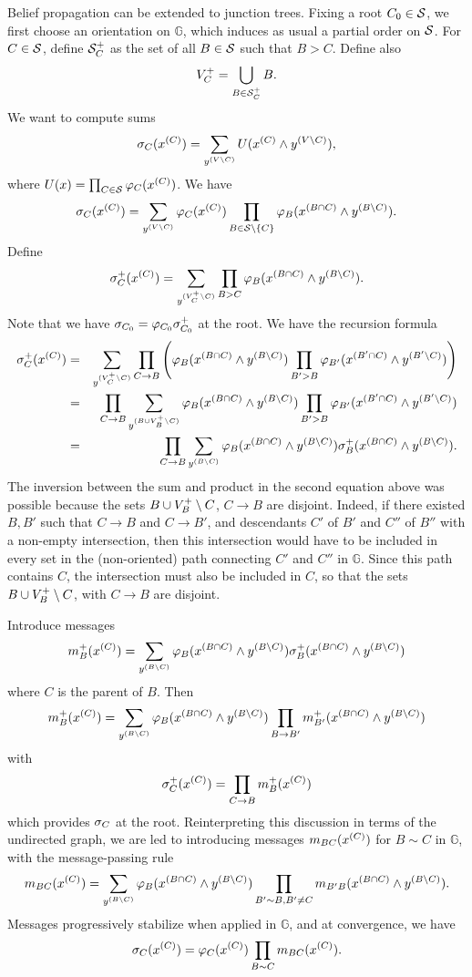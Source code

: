 Belief propagation can be extended to junction
trees. Fixing a root $C_0\in {\mathcal S}$, we first choose an orientation on $\mathbb G$, which induces as
usual a partial order on ${\mathcal S}$. For $C\in {\mathcal S}$, define ${\mathcal S}_C^+$ as
the set of all $B\in{\mathcal S}$ such that $B>C$. Define also 
\[
V_C^+ = \bigcup_{B\in {\mathcal S}_C^+} B.
\]
We want to compute sums
\[
\sigma_C(x^{(C)}) = \sum_{y^{(V\setminus C)}} U(x^{(C)} \wedge y^{(V\setminus C)}),
\]
where $U(x) = \prod_{C\in{\mathcal S}} \varphi_C(x^{(C)})$.
We have
\[
\sigma_C(x^{(C)}) = \sum_{y^{(V\setminus C)}} \varphi_C(x^{(C)}) \prod_{B\in {\mathcal S}\setminus
  \{C\}} \varphi_B(x^{(B\cap C)} \wedge y^{(B\setminus C)}).
\]
Define
\[
\sigma^+_C(x^{(C)}) = \sum_{y^{(V_C^+\setminus C)}} \prod_{B>C} \varphi_B(x^{(B\cap C)} \wedge y^{(B\setminus C)}).
\]
Note that we have $\sigma_{C_0} = \varphi_{C_0} \sigma_{C_0}^+$ at the root. 
We have the recursion formula
\begin{eqnarray*}
\sigma^+_C(x^{(C)}) &=& \sum_{y^{(V_C^+\setminus C)}} \prod_{C\to B} \left(\varphi_{B}(x^{(B\cap C)} \wedge y^{(B\setminus C)})\prod_{B'>B} \varphi_{B'}(x^{(B'\cap C)} \wedge y^{(B'\setminus C)})\right)\\
&=& \prod_{C\to B} \sum_{y^{(B\cup V_B^+\setminus C)}}  \varphi_{B}(x^{(B\cap C)}
\wedge y^{(B\setminus C)})\prod_{B'>B} \varphi_{B'}(x^{(B'\cap C)} \wedge
y^{(B'\setminus C)})\\
&=& \prod_{C\to B} \sum_{y^{(B\setminus C)}} \varphi_{B}(x^{(B\cap C)}
\wedge y^{(B\setminus C)})\sigma_B^+(x^{(B\cap C)}\wedge
y^{(B\setminus C)}).
\end{eqnarray*}
The inversion between the sum and product in the second equation
above was possible because the sets $B\cup V_B^+ \setminus C$, $C\to B$
are disjoint. Indeed, if there existed 
$B,B'$ such that $C\to B$ and $C\to B'$, and descendants $C'$ of $B'$
and $C''$ of $B''$ with a non-empty intersection, then this
intersection would have to be included in every set in the (non-oriented) path connecting $C'$
and   $C''$ in $\mathbb G$. Since this path contains $C$, the
intersection must also be included in $C$, so that the sets  $B\cup
V_B^+ \setminus C$, with $C\to B$
are disjoint. 

Introduce messages
\[
m_B^+(x^{( C)}) = \sum_{y^{(B\setminus C)}} \varphi_{B}(x^{(B\cap C)}
\wedge y^{(B\setminus C)})\sigma_B^+(x^{(B\cap C)}\wedge
y^{(B\setminus C)})
\]
where $C$ is the parent of $B$. Then
\[
m_{B}^+(x^{(C)}) = \sum_{y^{(B\setminus C)}} \varphi_{B}(x^{(B\cap C)}
\wedge y^{(B\setminus C)}) \prod_{B\to B'} m_{B'}^+(x^{(B\cap C)}\wedge
y^{(B\setminus C)})
\]
with
\[
\sigma^+_C(x^{(C)}) = \prod_{C\to B} m^+_B(x^{(C)})
\]
which provides $\sigma_C$ at the root. Reinterpreting this discussion in
terms of the undirected graph, we are led to introducing messages 
$m_{BC}(x^{(C)})$ for $B\sim C$ in $\mathbb G$, with the message-passing rule
\begin{equation}
\label{eq:jct.tree.mes}
m_{BC}(x^{(C)}) = \sum_{y^{(B\setminus C)}} \varphi_{B}(x^{(B\cap C)}
\wedge y^{(B\setminus C)}) \prod_{B'\sim B, B'\neq C } m_{B'B}(x^{(B\cap C)}\wedge
y^{(B\setminus C)}).
\end{equation}
Messages progressively stabilize when applied in $\mathbb G$, and at
convergence, we have
\begin{equation}
\label{eq:jct.tree.sum}
\sigma_C(x^{(C)}) = \varphi_C(x^{(C)}) \prod_{B\sim C} m_{BC}(x^{(C)}).
\end{equation}

